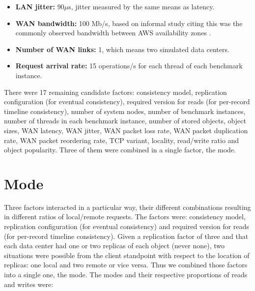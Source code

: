 \documentclass[doublespacing]{bmcart}
\begin{document}
\begin{itemize}
\item \textbf{LAN jitter:} $90\mu$s, jitter measured by the same means as
latency.

\item \textbf{WAN bandwidth:} 100 Mb/s, based on informal study citing this was
the commonly observed bandwidth between AWS availability zones
\cite{Pujol2012}.

\item \textbf{Number of WAN links:} 1, which means two simulated data centers.

\item \textbf{Request arrival rate:} 15 operations/s for each thread of each
benchmark instance.

\end{itemize}

There were 17 remaining candidate factors: consistency model,
replication configuration (for eventual consistency), required version for
reads (for per-record timeline consistency), number of system nodes, number of
benchmark instances, number of threads in each benchmark instance, number of
stored objects, object sizes, WAN latency, WAN jitter, WAN packet loss rate,
WAN packet duplication rate, WAN packet reordering rate, TCP variant, locality,
read/write ratio and object popularity. Three of them were combined in a single
factor, the mode.

\section{Mode}

Three factors interacted in a particular way, their different combinations
resulting in different ratios of local/remote requests. The factors were:
consistency model, replication configuration (for eventual consistency) and
required version for reads (for per-record timeline consistency). Given a
replication factor of three and that each data center had one or two replicas
of each object (never none), two situations were possible from the client
standpoint with respect to the location of replicas: one local and two remote
or vice versa. Thus we combined those factors into a single one, the mode. The
modes and their respective proportions of reads and writes were:
\end{document}
